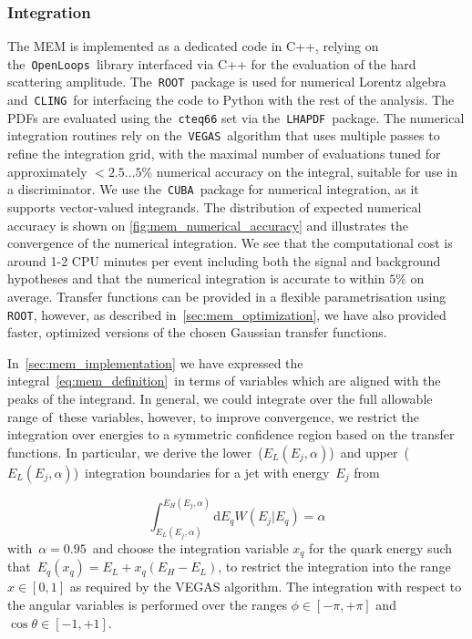 \subsubsection{Integration}
\label{sec:mem_integration}

The MEM is implemented as a dedicated code in C++, relying on the~\texttt{OpenLoops}~library interfaced via C++ for the evaluation of the hard scattering amplitude. The~\texttt{ROOT}~package is used for numerical Lorentz algebra and~\texttt{CLING}~for interfacing the code to Python with the rest of the analysis. The PDFs are evaluated using the~\texttt{cteq66} set via the~\texttt{LHAPDF}~package. The numerical integration routines rely on the~\texttt{VEGAS}~algorithm that uses multiple passes to refine the integration grid, with the maximal number of evaluations tuned for approximately $<2.5 \dots 5\%$ numerical accuracy on the integral, suitable for use in a discriminator. We use the~\texttt{CUBA}~package for numerical integration, as it supports vector-valued integrands. The distribution of expected numerical accuracy is shown on \cref{fig:mem_numerical_accuracy} and illustrates the convergence of the numerical integration. We see that the computational cost is around 1-2 CPU minutes per event including both the signal and background hypotheses and that the numerical integration is accurate to within $5\%$ on average. Transfer functions can be provided in a flexible parametrisation using \texttt{ROOT}, however, as described in~\cref{sec:mem_optimization}, we have also provided faster, optimized versions of the chosen Gaussian transfer functions.

In~\cref{sec:mem_implementation} we have expressed the integral~\cref{eq:mem_definition}~in terms of variables which are aligned with the peaks of the integrand. In general, we could integrate over the full allowable range of these variables, however, to improve convergence, we restrict the integration over energies to a symmetric confidence region based on the transfer functions. In particular, we derive the lower~($E_L(E_j,\alpha)$)~and upper~($E_L(E_j,\alpha)$)~integration boundaries for a jet with energy~$E_j$ from

\begin{equation}
\int_{E_L(E_j,\alpha)}^{E_H(E_j,\alpha)} \mathrm{d}E_q W(E_j | E_q) = \alpha
\end{equation}
with~$\alpha = 0.95$~and choose the integration variable $x_q$ for the quark energy such that~$E_q(x_q) = E_L + x_q (E_H - E_L)$, to restrict the integration into the range $x\in[0,1]$ as required by the VEGAS algorithm. The integration with respect to the angular variables is performed over the ranges $\phi \in [-\pi, +\pi]$ and $\cos{\theta} \in [-1, +1]$.

